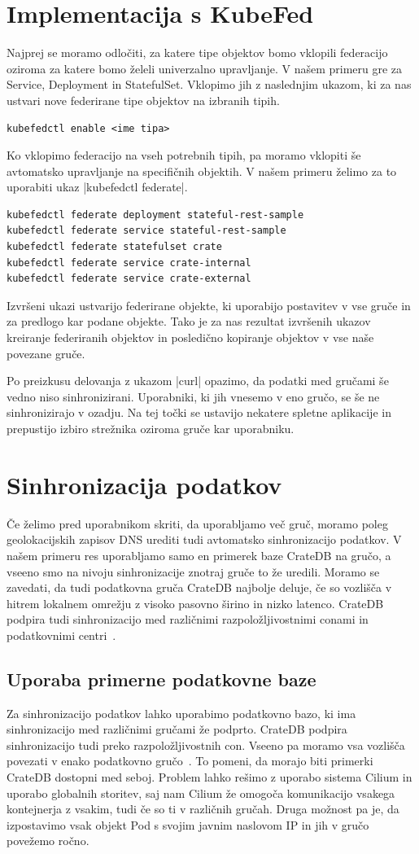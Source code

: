 \documentclass[a4paper, 12pt]{book}
\begin{document}
\section{Implementacija s KubeFed}
Najprej se moramo odločiti, za katere tipe objektov bomo vklopili federacijo oziroma za katere bomo želeli univerzalno upravljanje.
V našem primeru gre za Service, Deployment in StatefulSet.
Vklopimo jih z naslednjim ukazom, ki za nas ustvari nove federirane tipe objektov na izbranih tipih.
\begin{verbatim}
kubefedctl enable <ime tipa>
\end{verbatim}
Ko vklopimo federacijo na vseh potrebnih tipih, pa moramo vklopiti še avtomatsko upravljanje na specifičnih objektih.
V našem primeru želimo za to uporabiti ukaz \spverb|kubefedctl federate|.
\begin{verbatim}
kubefedctl federate deployment stateful-rest-sample
kubefedctl federate service stateful-rest-sample
kubefedctl federate statefulset crate
kubefedctl federate service crate-internal
kubefedctl federate service crate-external
\end{verbatim}
Izvršeni ukazi ustvarijo federirane objekte, ki uporabijo postavitev v vse gruče in za predlogo kar podane objekte.
Tako je za nas rezultat izvršenih ukazov kreiranje federiranih objektov in posledično kopiranje objektov v vse naše povezane gruče.

Po preizkusu delovanja z ukazom \spverb|curl| opazimo, da podatki med gručami še vedno niso sinhronizirani.
Uporabniki, ki jih vnesemo v eno gručo, se še ne sinhronizirajo v ozadju.
Na tej točki se ustavijo nekatere spletne aplikacije in prepustijo izbiro strežnika oziroma gruče kar uporabniku.
\section{Sinhronizacija podatkov}
Če želimo pred uporabnikom skriti, da uporabljamo več gruč, moramo poleg geolokacijskih zapisov DNS urediti tudi avtomatsko sinhronizacijo podatkov.
V našem primeru res uporabljamo samo en primerek baze CrateDB na gručo, a vseeno smo na nivoju sinhronizacije znotraj gruče to že uredili. 
Moramo se zavedati, da tudi podatkovna gruča CrateDB najbolje deluje, če so vozlišča v hitrem lokalnem omrežju z visoko pasovno širino in nizko latenco.
Crate\-DB podpira tudi sinhronizacijo med različnimi razpoložljivostnimi conami in podatkovnimi centri~\cite{cratedb-zone}.
\subsection{Uporaba primerne podatkovne baze}
Za sinhronizacijo podatkov lahko uporabimo podatkovno bazo, ki ima sinhronizacijo med različnimi gručami že podprto.
CrateDB podpira sinhronizacijo tudi preko razpoložljivostnih con.
Vseeno pa moramo vsa vozlišča povezati v enako podatkovno gručo~\cite{cratedb-zone}.
To pomeni, da morajo biti primerki CrateDB dostopni med seboj.
Problem lahko rešimo z uporabo sistema Cilium in uporabo globalnih storitev, saj nam Cilium že omogoča komunikacijo vsakega kontejnerja z vsakim, tudi če so ti v različnih gručah.
Druga možnost pa je, da izpostavimo vsak objekt Pod s svojim javnim naslovom IP in jih v gručo povežemo ročno.
\end{document}
